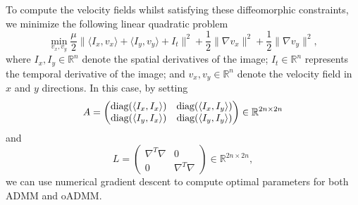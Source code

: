\documentclass[letterpaper]{article} %
\begin{document}
To compute the velocity fields whilst satisfying these diffeomorphic constraints, we minimize the following linear quadratic problem \cite{thorley2021nesterov}
\begin{equation} \label{eq:OF}
\min_{v_x, v_y} \frac{\mu}{2} \| \langle  I_x, {v_x} \rangle + \langle I_y, {v_y} \rangle + I_t   \|^2 + \frac{1}{2} \|\nabla v_x\|^2 + \frac{1}{2}  \|\nabla v_y\|^2,
\end{equation}
where $I_x, I_y\in \mathbb{R}^{n}$ denote the spatial derivatives of the image; $I_t\in \mathbb{R}^{n}$ represents the temporal derivative of the image; and $v_x, v_y \in \mathbb{R}^{n}$ denote the velocity field in $x$ and $y$ directions. In this case, by setting 
$$A=\begin{pmatrix}
\textup{diag}(\langle I_x, I_x \rangle ) & \textup{diag}(\langle I_x, I_y \rangle )\\ 
\textup{diag}(\langle I_y, I_x \rangle ) & \textup{diag}(\langle I_y, I_y \rangle )
\end{pmatrix} \in \mathbb{R}^{2n\times2n} $$
and
$$L=\begin{pmatrix}
\nabla ^T\nabla  & 0\\ 
0 & \nabla ^T\nabla  
\end{pmatrix}\in \mathbb{R}^{2n\times2n},$$
we can use numerical gradient descent to compute optimal parameters for both ADMM and oADMM.
\end{document}
